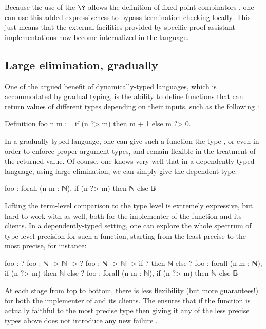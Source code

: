 Because the use of the  $\?$
allows the definition of fixed point combinators ,
one can use this added expressiveness to bypass termination checking locally.
This just means that the external facilities provided by specific proof assistant implementations now become internalized in the language.

\subsection{Large elimination, gradually}
\label{sec:elim}

One of the argued benefit of dynamically-typed languages, which is accommodated by gradual typing, is the ability to define functions that can return values of different types depending on their inputs, such as the following%
:
\begin{coqcode}
  Definition foo n m := if (n ?> m) then m + 1 else m ?> 0.
\end{coqcode}

In a gradually-typed language, one can give such a function the type ,
or even  in order to enforce proper argument types,
and remain flexible in the treatment of the returned value.
Of course, one knows very well that in a dependently-typed language, using large elimination, we can simply give  the dependent type:
\begin{coqcode}
  foo : forall (n m : ℕ), if (n ?> m) then ℕ else 𝔹
\end{coqcode}

Lifting the term-level comparison  to the type level is extremely expressive, but hard to work with as well, both for the implementer of the function and its clients.
In a dependently-typed setting, one can explore the whole spectrum of type-level precision for such a function, starting from the least precise to the most precise, for instance:
\begin{coqcode}
    foo : ?
    foo : ℕ -> ℕ -> ?
    foo : ℕ -> ℕ -> if ? then ℕ else ?
    foo : forall (n m : ℕ), if (n ?> m) then ℕ else ?
    foo : forall (n m : ℕ), if (n ?> m) then ℕ else 𝔹
\end{coqcode}

At each stage from top to bottom, there is less flexibility (but more guarantees!) for both the implementer of  and its clients. The %
ensures that if the function is actually faithful to the most precise type
then giving it any of the less precise types above does not introduce any new failure
.

